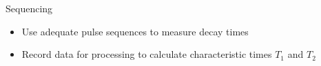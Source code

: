 \documentclass[aspectratio=169,xcolor=dvipsnames]{beamer}
\newcommand{\halfpi}{\frac{\pi}{2}}
\begin{document}
\begin{frame}{Sequencing}
    \begin{itemize}
        \item Use adequate pulse sequences to measure decay times
        \item Record data for processing to calculate characteristic times $T_1$ and $T_2$
    \end{itemize}
\end{frame}

    










\end{document}
